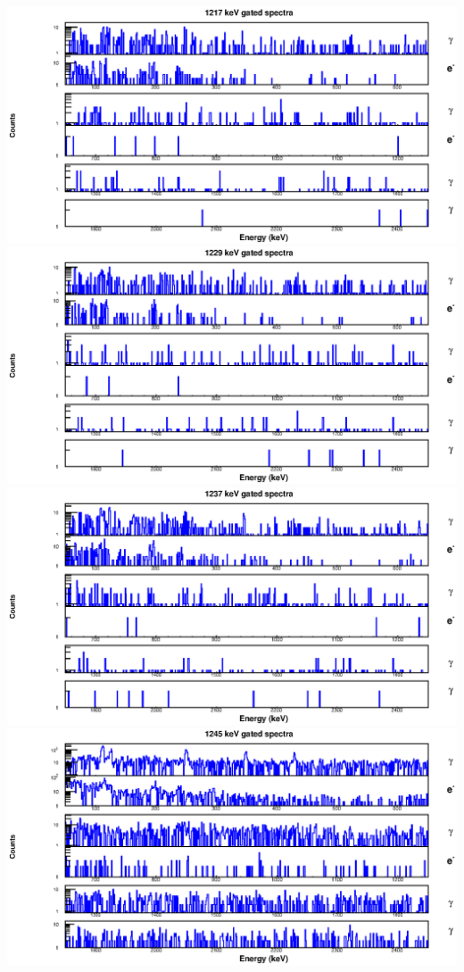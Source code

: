 \begin{landscape}
\includegraphics[scale=1.2]{154Gd_Appendix/1217_combined.eps}
\includegraphics[scale=1.2]{154Gd_Appendix/1229_combined.eps}
\includegraphics[scale=1.2]{154Gd_Appendix/1237_combined.eps}
\includegraphics[scale=1.2]{154Gd_Appendix/1245_combined.eps}

\end{landscape}

